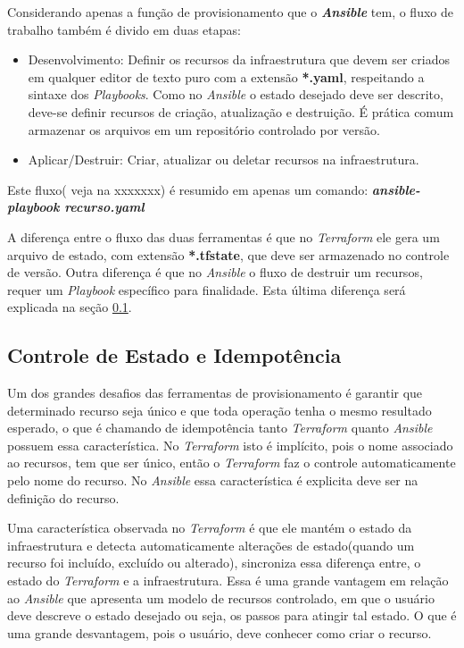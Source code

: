 \hfill

Considerando apenas a função de provisionamento que o \textbf{\textit{Ansible}} tem, o fluxo de trabalho também é divido em duas etapas:

\begin{itemize}
  \item Desenvolvimento: Definir os recursos da infraestrutura que devem ser criados em qualquer editor de texto puro com a extensão \textbf{*.yaml}, respeitando a sintaxe dos \textit{Playbooks}. Como no \textit{Ansible} o estado desejado deve ser descrito, deve-se definir recursos de criação, atualização e destruição.  É prática comum armazenar os arquivos em um repositório controlado por versão. 
  \item Aplicar/Destruir: Criar, atualizar ou deletar recursos na infraestrutura. 
\end{itemize}


Este fluxo( veja na xxxxxxx) é resumido em apenas um comando: \textbf{\textit{ansible-playbook recurso.yaml}}


A diferença entre o fluxo das duas ferramentas é que no \textit{Terraform} ele gera um arquivo de estado, com extensão \textbf{*.tfstate}, que deve ser armazenado no controle de versão. Outra diferença é que no \textit{Ansible} o fluxo de destruir um recursos, requer um \textit{Playbook} específico para finalidade. Esta última diferença será explicada na seção \ref{idem}.  

\subsection{Controle de Estado e Idempotência} \label{idem}
Um dos grandes desafios das ferramentas de provisionamento é garantir que determinado recurso seja único e que toda operação tenha o mesmo resultado esperado, o que é chamando de idempotência tanto  \textit{Terraform} quanto \textit{Ansible} possuem essa característica. No \textit{Terraform} isto é implícito, pois o nome associado ao recursos, tem que ser único, então o \textit{Terraform} faz o controle automaticamente pelo nome do recurso. No \textit{Ansible} essa característica é explicita deve ser na definição do recurso.

Uma característica observada no \textit{Terraform} é que ele mantém o estado da infraestrutura e detecta automaticamente alterações de estado(quando um recurso foi incluído, excluído ou alterado), sincroniza essa diferença entre, o estado do \textit{Terraform} e a infraestrutura. Essa é uma grande vantagem em relação ao \textit{Ansible} que apresenta um modelo de recursos controlado, em que o usuário deve descreve o estado desejado ou seja, os passos para atingir tal estado. O que é uma grande desvantagem, pois o usuário, deve conhecer como criar o recurso. 


